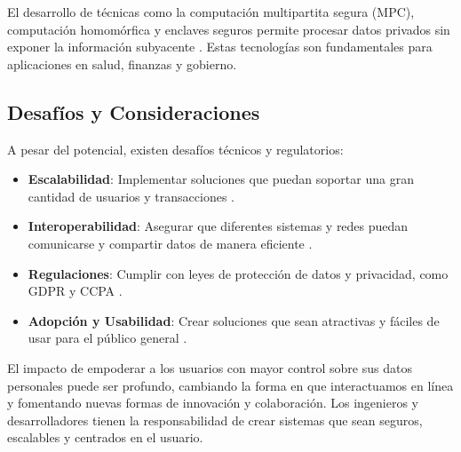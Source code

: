 El desarrollo de técnicas como la computación multipartita segura (MPC), computación homomórfica y enclaves seguros permite procesar datos privados sin exponer la información subyacente \cite{lindell2020secure}. Estas tecnologías son fundamentales para aplicaciones en salud, finanzas y gobierno.

\subsection{Desafíos y Consideraciones}

A pesar del potencial, existen desafíos técnicos y regulatorios:

\begin{itemize}
    \item \textbf{Escalabilidad}: Implementar soluciones que puedan soportar una gran cantidad de usuarios y transacciones \cite{croman2016scaling}.
    \item \textbf{Interoperabilidad}: Asegurar que diferentes sistemas y redes puedan comunicarse y compartir datos de manera eficiente \cite{hardjono2019blockchain}.
    \item \textbf{Regulaciones}: Cumplir con leyes de protección de datos y privacidad, como GDPR y CCPA \cite{finck2018blockchain}.
    \item \textbf{Adopción y Usabilidad}: Crear soluciones que sean atractivas y fáciles de usar para el público general \cite{robinson2019user}.
\end{itemize}

El impacto de empoderar a los usuarios con mayor control sobre sus datos personales puede ser profundo, cambiando la forma en que interactuamos en línea y fomentando nuevas formas de innovación y colaboración. Los ingenieros y desarrolladores tienen la responsabilidad de crear sistemas que sean seguros, escalables y centrados en el usuario.


